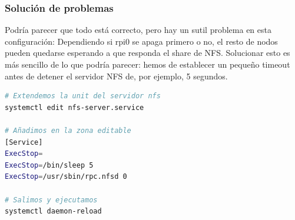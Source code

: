\subsubsection{Solución de problemas}
Podría parecer que todo está correcto, pero hay un sutil problema en esta configuración: Dependiendo si rpi0 se apaga primero o no, el resto de nodos pueden quedarse esperando a que responda el share de NFS. Solucionar esto es más sencillo de lo que podría parecer: hemos de establecer un pequeño timeout antes de detener el servidor NFS de, por ejemplo, 5 segundos.

\begin{lstlisting}[language=bash]
# Extendemos la unit del servidor nfs
systemctl edit nfs-server.service

# Añadimos en la zona editable
[Service]
ExecStop=
ExecStop=/bin/sleep 5
ExecStop=/usr/sbin/rpc.nfsd 0

# Salimos y ejecutamos
systemctl daemon-reload
\end{lstlisting}
